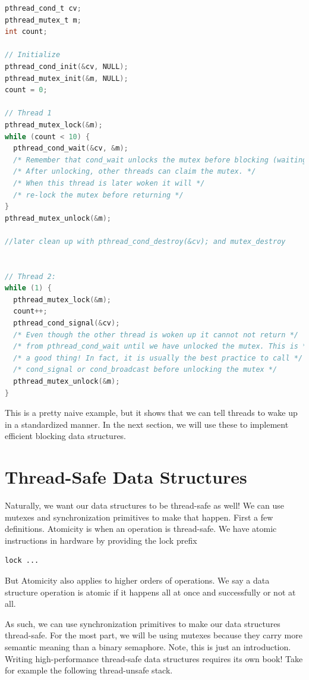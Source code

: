 \begin{lstlisting}[language=C]
pthread_cond_t cv;
pthread_mutex_t m;
int count;

// Initialize
pthread_cond_init(&cv, NULL);
pthread_mutex_init(&m, NULL);
count = 0;

// Thread 1
pthread_mutex_lock(&m);
while (count < 10) {
  pthread_cond_wait(&cv, &m);
  /* Remember that cond_wait unlocks the mutex before blocking (waiting)! */
  /* After unlocking, other threads can claim the mutex. */
  /* When this thread is later woken it will */
  /* re-lock the mutex before returning */
}
pthread_mutex_unlock(&m);

//later clean up with pthread_cond_destroy(&cv); and mutex_destroy


// Thread 2:
while (1) {
  pthread_mutex_lock(&m);
  count++;
  pthread_cond_signal(&cv);
  /* Even though the other thread is woken up it cannot not return */
  /* from pthread_cond_wait until we have unlocked the mutex. This is */
  /* a good thing! In fact, it is usually the best practice to call */
  /* cond_signal or cond_broadcast before unlocking the mutex */
  pthread_mutex_unlock(&m);
}
\end{lstlisting}

This is a pretty naive example, but it shows that we can tell threads to wake up in a standardized manner.
In the next section, we will use these to implement efficient blocking data structures.

\section{Thread-Safe Data Structures}

Naturally, we want our data structures to be thread-safe as well!
We can use mutexes and synchronization primitives to make that happen.
First a few definitions.
Atomicity is when an operation is thread-safe.
We have atomic instructions in hardware by providing the lock prefix
\begin{lstlisting}
lock ...
\end{lstlisting}
But Atomicity also applies to higher orders of operations.
We say a data structure operation is atomic if it happens all at once and successfully or not at all.

As such, we can use synchronization primitives to make our data structures thread-safe.
For the most part, we will be using mutexes because they carry more semantic meaning than a binary semaphore.
Note, this is just an introduction.
Writing high-performance thread-safe data structures requires its own book!
Take for example the following thread-unsafe stack.


